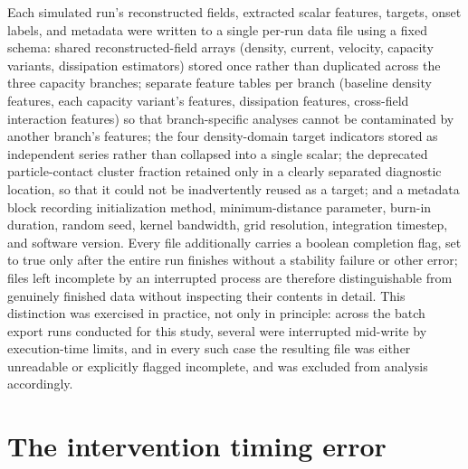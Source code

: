 \documentclass[11pt]{article}
\begin{document}
Each simulated run's reconstructed fields, extracted scalar features, targets, onset labels, and metadata were written to a single per-run data file using a fixed schema: shared reconstructed-field arrays (density, current, velocity, capacity variants, dissipation estimators) stored once rather than duplicated across the three capacity branches; separate feature tables per branch (baseline density features, each capacity variant's features, dissipation features, cross-field interaction features) so that branch-specific analyses cannot be contaminated by another branch's features; the four density-domain target indicators stored as independent series rather than collapsed into a single scalar; the deprecated particle-contact cluster fraction retained only in a clearly separated diagnostic location, so that it could not be inadvertently reused as a target; and a metadata block recording initialization method, minimum-distance parameter, burn-in duration, random seed, kernel bandwidth, grid resolution, integration timestep, and software version. Every file additionally carries a boolean completion flag, set to true only after the entire run finishes without a stability failure or other error; files left incomplete by an interrupted process are therefore distinguishable from genuinely finished data without inspecting their contents in detail. This distinction was exercised in practice, not only in principle: across the batch export runs conducted for this study, several were interrupted mid-write by execution-time limits, and in every such case the resulting file was either unreadable or explicitly flagged incomplete, and was excluded from analysis accordingly.

\section{The intervention timing error}
\label{app:intervention-bug}
\end{document}
